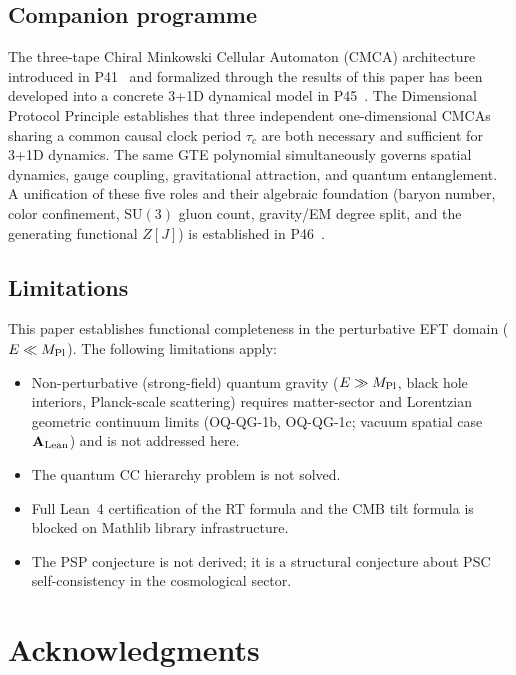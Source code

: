 \documentclass[11pt]{article}
\theoremstyle{remark}
\newcommand{\MPl}{M_{\rm Pl}}
\newcommand{\CatAL}{\ensuremath{\textbf{A}_{\rm Lean}}}
\begin{document}
\subsection{Companion programme}

The three-tape Chiral Minkowski Cellular Automaton (CMCA) architecture introduced in
P41~\cite{SpivackCMCA} and formalized through the results of this paper has been developed
into a concrete 3+1D dynamical model in P45~\cite{SpivackThreeTapeCMCA}.  The Dimensional
Protocol Principle establishes that three independent one-dimensional CMCAs sharing a
common causal clock period $\tau_c$ are both necessary and sufficient for 3+1D dynamics.
The same GTE polynomial simultaneously governs spatial dynamics, gauge coupling,
gravitational attraction, and quantum entanglement.  A unification of these five roles
and their algebraic foundation (baryon number, color confinement, $\mathrm{SU}(3)$ gluon
count, gravity/EM degree split, and the generating functional $Z[J]$) is established in
P46~\cite{SpivackGTEPolynomialUFT}.

\subsection{Limitations}

This paper establishes functional completeness in the perturbative EFT domain ($E\ll \MPl$).
The following limitations apply:
\begin{itemize}[noitemsep]
\item Non-perturbative (strong-field) quantum gravity ($E\gg\MPl$, black hole interiors,
  Planck-scale scattering) requires matter-sector and Lorentzian geometric continuum
  limits (OQ-QG-1b, OQ-QG-1c; vacuum spatial case \CatAL) and is not addressed here.
\item The quantum CC hierarchy problem is not solved.
\item Full Lean~4 certification of the RT formula and the CMB tilt formula is blocked on
  Mathlib library infrastructure.
\item The PSP conjecture is not derived; it is a structural conjecture about PSC
  self-consistency in the cosmological sector.
\end{itemize}

\section*{Acknowledgments}
\end{document}
